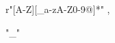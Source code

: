 \begin{module}{}


\begin{syntaxBlock}{}
  \syntax
    {r"[A-Z][\_a-zA-Z0-9@]*"}
    {, }
\end{syntaxBlock}

\begin{syntaxBlock}{}
  \syntax
    {"\_"}
    {}
\end{syntaxBlock}

\end{module}